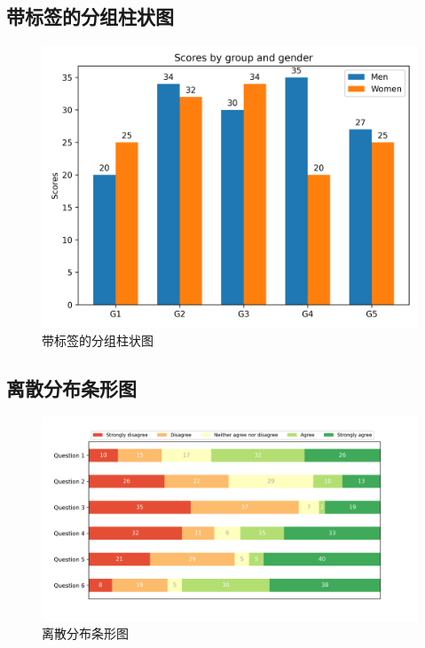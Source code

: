 \documentclass[openany]{progbookcn}
\begin{document}
\subsection{带标签的分组柱状图}

\begin{figure}[H]
\centering
\includegraphics[width=0.6 \textwidth]{figs/chapter24/bars/GroupedBar}
\caption{带标签的分组柱状图}
\end{figure}

\subsection{离散分布条形图}

\begin{figure}[H]
\centering
\includegraphics[width=0.6 \textwidth]{figs/chapter24/bars/DiscreteDistributionBar}
\caption{离散分布条形图}
\end{figure}
\end{document}
